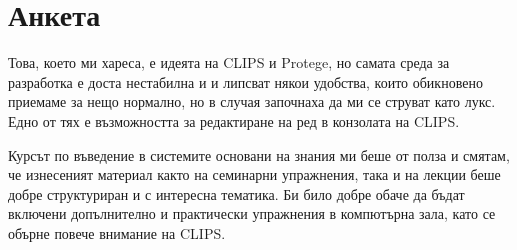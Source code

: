 \documentclass[a4paper,12pt]{article}
\begin{document}
\section{Анкета}
Това, което ми хареса, е идеята на CLIPS и Protege, но самата среда за разработка е доста нестабилна и и липсват някои удобства, които обикновено приемаме за нещо нормално, но в случая започнаха да ми се струват като лукс. Едно от тях е възможността за редактиране на ред в конзолата на CLIPS.

Курсът по въведение в системите основани на знания ми беше от полза и смятам, че изнесеният материал както на семинарни упражнения, така и на лекции беше добре структуриран и с интересна тематика. Би било добре обаче да бъдат включени допълнително и практически упражнения в компютърна зала, като се обърне повече внимание на CLIPS.
\end{document}
